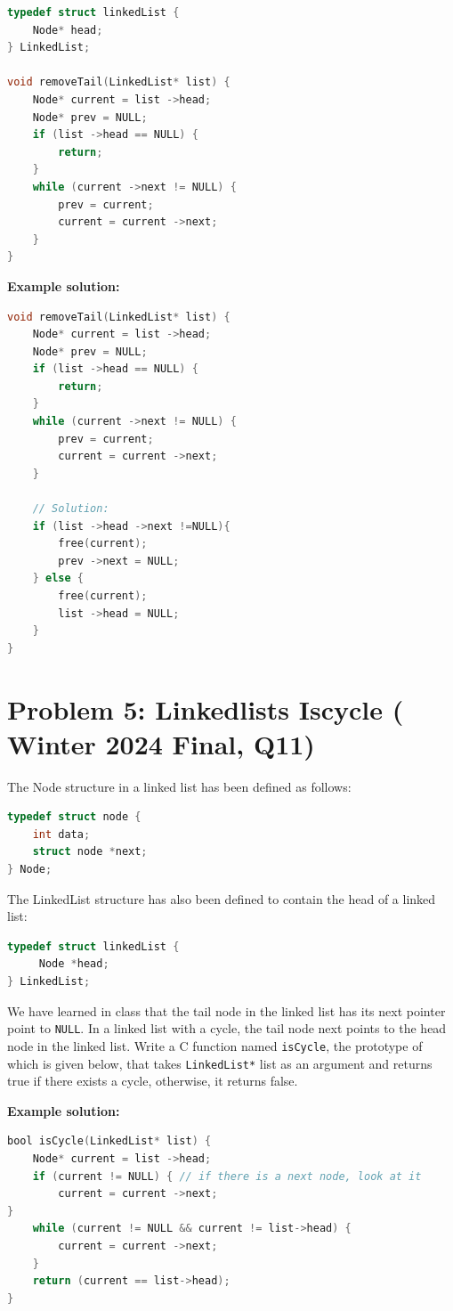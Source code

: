 \documentclass[12pt]{article}
\begin{document}
{\begin{lstlisting}[language=C]
typedef struct linkedList { 
	Node* head;
} LinkedList;

void removeTail(LinkedList* list) { 
	Node* current = list ->head;
	Node* prev = NULL;
	if (list ->head == NULL) {
		return; 
	}
	while (current ->next != NULL) { 
		prev = current;
		current = current ->next;
	} 
}
\end{lstlisting}

\textbf{Example solution:}
\begin{lstlisting}[language=C]
void removeTail(LinkedList* list) { 
	Node* current = list ->head;
	Node* prev = NULL;
	if (list ->head == NULL) {
		return; 
	}
	while (current ->next != NULL) { 
		prev = current;
		current = current ->next;
	} 
	
	// Solution:
	if (list ->head ->next !=NULL){
		free(current);
		prev ->next = NULL;
	} else { 
		free(current);
		list ->head = NULL;
	}
}
\end{lstlisting}

\section*{Problem 5:  Linkedlists Iscycle ( Winter 2024 Final, Q11)}

The Node structure in a linked list has been defined as follows:
\begin{lstlisting}[language=C]
typedef struct node { 
	int data;
	struct node *next;
} Node;
\end{lstlisting}
The LinkedList structure has also been defined to contain the head of a linked list:
\begin{lstlisting}[language=C]
typedef struct linkedList { 
	 Node *head;
} LinkedList;
\end{lstlisting}
We have learned in class that the tail node in the linked list has its next pointer point to \texttt{NULL}. In a linked list with a cycle, the tail node next points to the head node in the linked list. Write a C function named \texttt{isCycle}, the prototype of which is given below, that takes \texttt{LinkedList*} list as an argument and returns true if there exists a cycle, otherwise, it returns false.

\textbf{Example solution:}
\begin{lstlisting}[language=C]
bool isCycle(LinkedList* list) { 
	Node* current = list ->head;
	if (current != NULL) { // if there is a next node, look at it 
		current = current ->next;
}
	while (current != NULL && current != list->head) {
		current = current ->next; 
	}
	return (current == list->head); 
}
\end{lstlisting}



}
\end{document}
